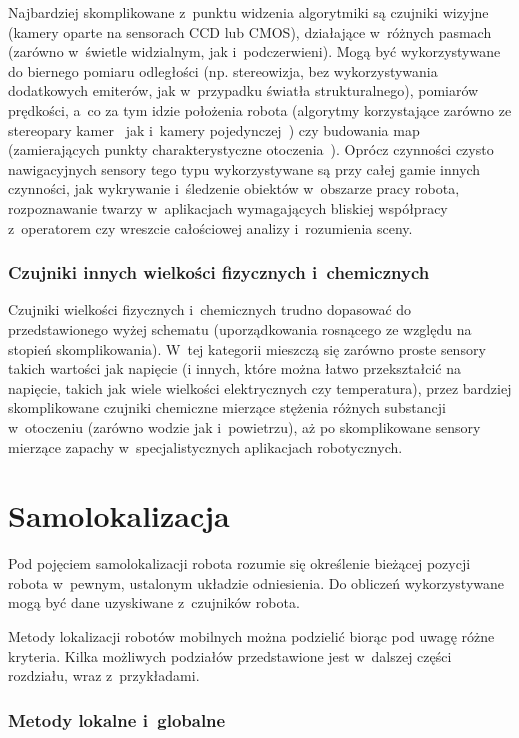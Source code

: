 Najbardziej skomplikowane z~punktu widzenia algorytmiki są czujniki wizyjne
(kamery oparte na sensorach CCD lub CMOS), działające w~różnych pasmach
(zarówno w~świetle widzialnym, jak i~podczerwieni). Mogą być wykorzystywane
do biernego pomiaru odległości (np. stereowizja, bez wykorzystywania dodatkowych
emiterów, jak w~przypadku światła strukturalnego), pomiarów prędkości,
a~co za tym idzie położenia robota (algorytmy korzystające zarówno ze stereopary
kamer~\cite{vodom_stereo} jak i~kamery pojedynczej~\cite{vodom_mono}) czy budowania
map (zamierających punkty charakterystyczne otoczenia~\cite{vslam}). Oprócz
czynności czysto nawigacyjnych sensory tego typu wykorzystywane są przy całej
gamie innych czynności, jak wykrywanie i~śledzenie obiektów w~obszarze pracy robota,
rozpoznawanie twarzy w~aplikacjach wymagających bliskiej współpracy z~operatorem
czy wreszcie całościowej analizy i~rozumienia sceny.

\subsubsection{Czujniki innych wielkości fizycznych i~chemicznych}

Czujniki wielkości fizycznych i~chemicznych trudno dopasować do przedstawionego
wyżej schematu (uporządkowania rosnącego ze względu na stopień skomplikowania).
W~tej kategorii mieszczą się zarówno proste sensory takich wartości jak
napięcie (i innych, które można łatwo przekształcić na napięcie, takich jak
wiele wielkości elektrycznych czy temperatura), przez bardziej skomplikowane
czujniki chemiczne mierzące stężenia różnych substancji w~otoczeniu (zarówno
wodzie jak i~powietrzu), aż po skomplikowane sensory mierzące zapachy
w~specjalistycznych aplikacjach robotycznych.

\section{Samolokalizacja}

Pod pojęciem samolokalizacji robota rozumie się określenie bieżącej pozycji
robota w~pewnym, ustalonym układzie odniesienia. Do obliczeń wykorzystywane mogą
być dane uzyskiwane z~czujników robota.

Metody lokalizacji robotów mobilnych można podzielić biorąc pod uwagę różne
kryteria. Kilka możliwych podziałów przedstawione jest w~dalszej części
rozdziału, wraz z~przykładami.

\subsubsection{Metody lokalne i~globalne}

